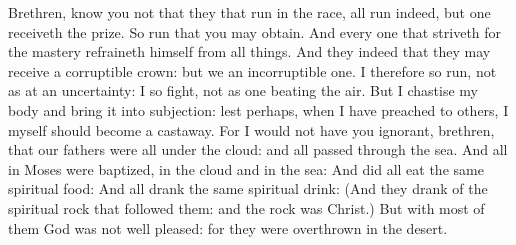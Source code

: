 Brethren, know you not that they that run in the race, all run indeed, but one receiveth
the prize. So run that you may obtain.  And every one that striveth for the
mastery refraineth himself from all things. And they indeed that they may
receive a corruptible crown: but we an incorruptible one.  I therefore so run,
not as at an uncertainty: I so fight, not as one beating the air.  But I
chastise my body and bring it into subjection: lest perhaps, when I have
preached to others, I myself should become a castaway.   For I would not have you
ignorant, brethren, that our fathers were all under the cloud: and all passed
through the sea.  And all in Moses were baptized, in the cloud and in the sea:
 And did all eat
the same spiritual food: And all drank the same spiritual drink: (And they
drank of the spiritual rock that followed them: and the rock was Christ.) But
with most of them God was not well pleased: for they were overthrown in the
desert.



